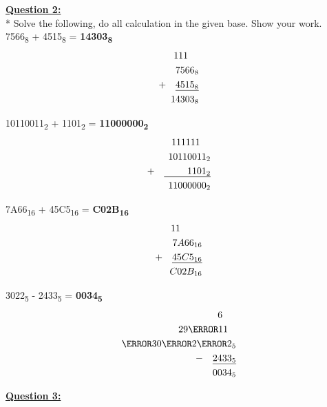 \documentclass[12pt, letterpaper, twoside]{article}
\begin{document}
\newpage
\noindent \underline{\textbf{Question 2:}}\\*
Solve the following, do all calculation in the given base. Show your work.\\
\break
{} 7566\textsubscript{8} + 4515\textsubscript{8} = \textbf{14303\textsubscript{8}}\\
\begin{align*}
    111\hspace{4mm} \\
    7566_{8}\\ + \quad
    \underline{4515_{8}}\\
    14303_{8}
\end{align*}

\noindent {} 10110011\textsubscript{2} + 1101\textsubscript{2} = \textbf{11000000\textsubscript{2}}
\begin{align*}
    111111\hspace{3.9mm} \\
    10110011_{2}\\ + \quad
    \underline{\phantom{1011_{2}}1101_{2}}\\
    11000000_{2}
\end{align*}

\noindent {} 7A66\textsubscript{16} + 45C5\textsubscript{16} =  \textbf{C02B\textsubscript{16}}\\
\begin{align*}
    11\hspace{8mm} \\
    7A66_{16}\\ + \quad
    \underline{45C5_{16}}\\
    C02B_{16}
\end{align*}

\noindent {} 3022\textsubscript{5} - 2433\textsubscript{5} = \textbf{0034\textsubscript{5}}
\begin{align*}
    6\hspace{5mm}\\
    29\cancel{1}1\hspace{3mm}\\
    \cancel{3} 0\cancel{2} \cancel{2}_{5}\\ 
    - \quad    \underline{2433_{5}}\\
    0034_{5}\\
\end{align*}

\newpage
\noindent \underline{\textbf{Question 3:}}\\
\end{document}
